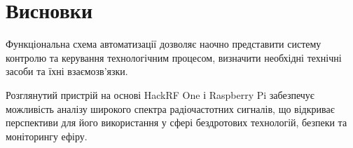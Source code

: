 \documentclass[a4paper,12pt]{article}
\begin{document}
\section{Висновки}
Функціональна схема автоматизації дозволяє наочно представити систему контролю та керування технологічним процесом, визначити необхідні технічні засоби та їхні взаємозв'язки. 

Розглянутий пристрій на основі HackRF One і Raspberry Pi забезпечує можливість аналізу широкого спектра радіочастотних сигналів, що відкриває перспективи для його використання у сфері бездротових технологій, безпеки та моніторингу ефіру.
\end{document}
